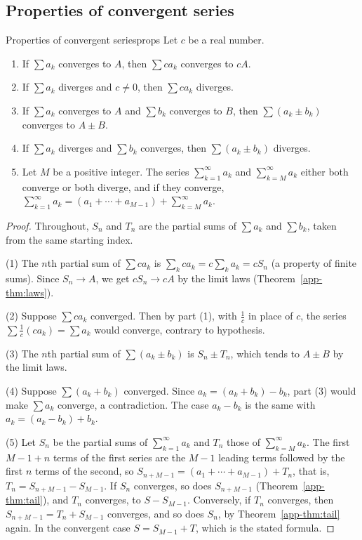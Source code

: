 \documentclass[11pt]{article}
\begin{document}
\subsection*{Properties of convergent series}

\begin{thm}{Properties of convergent series}{props}
Let $c$ be a real number.
\begin{enumerate}[label=(\arabic*)]
  \item If $\sum a_k$ converges to $A$, then $\sum ca_k$ converges to $cA$.
  \item If $\sum a_k$ diverges and $c\ne0$, then $\sum ca_k$ diverges.
  \item If $\sum a_k$ converges to $A$ and $\sum b_k$ converges to $B$, then $\sum(a_k\pm b_k)$ converges to $A\pm B$.
  \item If $\sum a_k$ diverges and $\sum b_k$ converges, then $\sum(a_k\pm b_k)$ diverges.
  \item Let $M$ be a positive integer. The series $\sum_{k=1}^\infty a_k$ and $\sum_{k=M}^\infty a_k$ either both converge or both diverge, and if they converge, $\sum_{k=1}^\infty a_k=(a_1+\cdots+a_{M-1})+\sum_{k=M}^\infty a_k$.
\end{enumerate}
\end{thm}
\begin{proof}
Throughout, $S_n$ and $T_n$ are the partial sums of $\sum a_k$ and $\sum b_k$, taken from the same starting index.

(1) The $n$th partial sum of $\sum ca_k$ is $\sum_{k}ca_k=c\sum_ka_k=cS_n$ (a property of finite sums). Since $S_n\to A$, we get $cS_n\to cA$ by the limit laws (Theorem~\ref{app-thm:laws}).

(2) Suppose $\sum ca_k$ converged. Then by part (1), with $\frac1c$ in place of $c$, the series $\sum\frac1c(ca_k)=\sum a_k$ would converge, contrary to hypothesis.

(3) The $n$th partial sum of $\sum(a_k\pm b_k)$ is $S_n\pm T_n$, which tends to $A\pm B$ by the limit laws.

(4) Suppose $\sum(a_k+b_k)$ converged. Since $a_k=(a_k+b_k)-b_k$, part (3) would make $\sum a_k$ converge, a contradiction. The case $a_k-b_k$ is the same with $a_k=(a_k-b_k)+b_k$.

(5) Let $S_n$ be the partial sums of $\sum_{k=1}^\infty a_k$ and $T_n$ those of $\sum_{k=M}^\infty a_k$. The first $M-1+n$ terms of the first series are the $M-1$ leading terms followed by the first $n$ terms of the second, so $S_{n+M-1}=(a_1+\cdots+a_{M-1})+T_n$, that is, $T_n=S_{n+M-1}-S_{M-1}$. If $S_n$ converges, so does $S_{n+M-1}$ (Theorem~\ref{app-thm:tail}), and $T_n$ converges, to $S-S_{M-1}$. Conversely, if $T_n$ converges, then $S_{n+M-1}=T_n+S_{M-1}$ converges, and so does $S_n$, by Theorem~\ref{app-thm:tail} again. In the convergent case $S=S_{M-1}+T$, which is the stated formula.
\end{proof}
\end{document}
